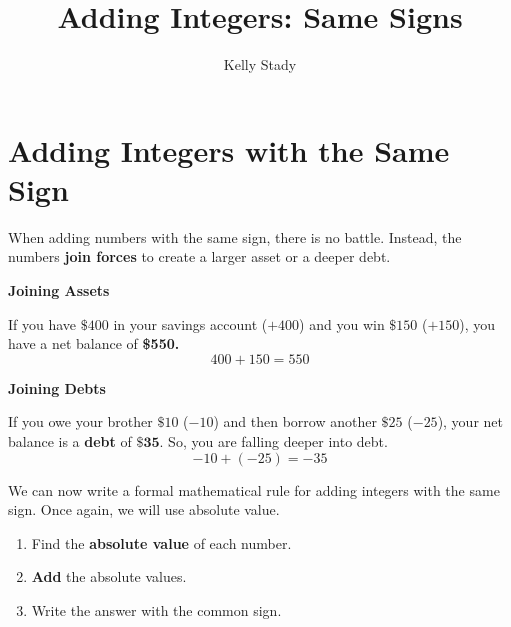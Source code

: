 \documentclass{ximera}[font=12pt]
\title{Adding Integers: Same Signs}   %
\author{Kelly Stady}
\begin{document}
\begin{abstract}

\end{abstract}

\maketitle
\label{xim:AddIntSameSActivity}


\section*{Adding Integers with the Same Sign}

When adding numbers with the same sign, there is no battle.  Instead, the numbers \textbf{join forces} to 
create a larger asset or a deeper debt.

\begin{example} \textcolor{accessibleOrange}{\textbf{Joining Assets}}

If you have $\$400$ in your savings account ($+400$) and you win $\$150$ ($+150$), you have a net balance of \textbf{\$550.}
\[ 400 + 150 = 550 \]

\end{example}

\begin{example} \textcolor{accessibleOrange}{\textbf{Joining Debts}}

If you owe your brother $\$10$ ($-10$) and then borrow another $\$25$ ($-25$), your net balance is a \textbf{debt} of $\mathbf{\$35.}$ 
So, you are falling deeper into debt.
\[ -10 + (-25) = -35 \]

\end{example}


We can now write a formal mathematical rule for adding integers with the same sign.  Once again, we will use absolute value.


\begin{procedure}

\begin{enumerate} 
    \item Find the \textbf{absolute value} of each number.

     \item \textbf{Add} the absolute values.

     \item Write the answer with the common sign.
\end{enumerate}
\end{procedure}
\end{document}

